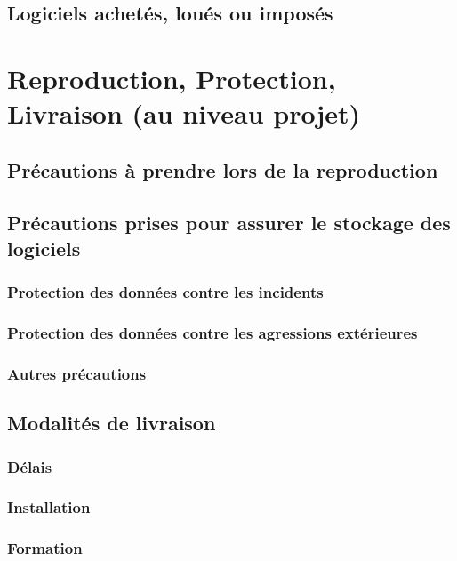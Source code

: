 \documentclass[a4paper]{article}
\begin{document}
\subsection{Logiciels achetés, loués ou imposés}

\section{Reproduction, Protection, Livraison (au niveau projet)}

\subsection{Précautions à prendre lors de la reproduction}

\subsection{Précautions prises pour assurer le stockage des logiciels}

\subsubsection{Protection des données contre les incidents}

\subsubsection{Protection des données contre les agressions extérieures}

\subsubsection{Autres précautions}

\subsection{Modalités de livraison}

\subsubsection{Délais}

\subsubsection{Installation}

\subsubsection{Formation}
\end{document}
